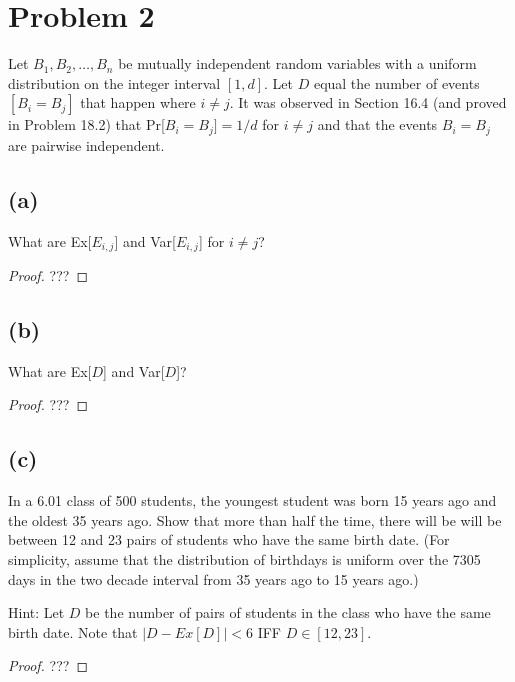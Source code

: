 \documentclass[14pt]{extarticle}
\begin{document}
\section{Problem 2}
Let $B_1, B_2, \ldots, B_n$ be mutually independent random variables with a uniform distribution on the integer interval $[1,d]$. Let $D$ equal the number of events $[B_i = B_j]$ that happen where $i \neq j$. It was observed in Section 16.4 (and proved in Problem 18.2) that Pr[$B_i = B_j] = 1/d$ for $i \neq j$ and that the events $B_i = B_j$ are pairwise independent.

\subsection{(a)}
What are Ex[$E_{i,j}$] and Var[$E_{i,j}$] for $i \neq j$?

\begin{proof}
???
\end{proof}

\subsection{(b)}
What are Ex[$D$] and Var[$D$]?

\begin{proof}
???
\end{proof}

\subsection{(c)}
In a 6.01 class of 500 students, the youngest student was born 15 years ago and the oldest 35 years ago. Show that more than half the time, there will be will be between 12 and 23 pairs of students who have the same birth date. (For simplicity, assume that the distribution of birthdays is uniform over the 7305 days in the two decade interval from 35 years ago to 15 years ago.)

Hint: Let $D$ be the number of pairs of students in the class who have the same birth date. Note that $|D - Ex[D]| < 6$ IFF $D \in [12, 23]$.

\begin{proof}
???
\end{proof}
\end{document}
